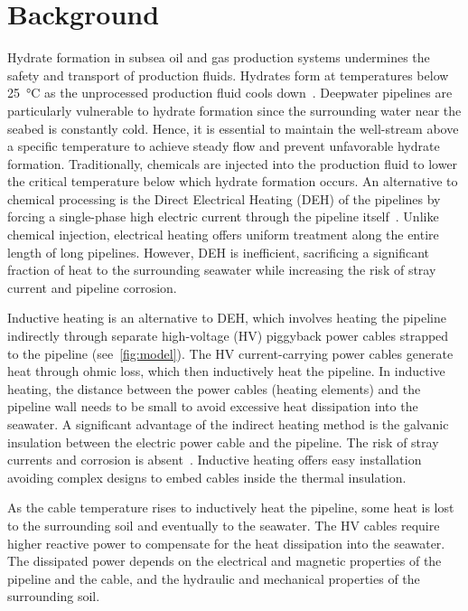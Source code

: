 \documentclass[Journal,letterpaper,InsideFigs]{ascelike-new}
\begin{document}
\section{Background}
Hydrate formation in subsea oil and gas production systems undermines the safety and transport of production fluids. Hydrates form at temperatures below \SI{25}{\celsius} as the unprocessed production fluid cools down~\cite{nazeri2014evaluation,daraboina2015natural}. Deepwater pipelines are particularly vulnerable to hydrate formation since the surrounding water near the seabed is constantly cold. Hence, it is essential to maintain the well-stream above a specific temperature to achieve steady flow and prevent unfavorable hydrate formation. Traditionally, chemicals are injected into the production fluid to lower the critical temperature below which hydrate formation occurs. An alternative to chemical processing is the Direct Electrical Heating (DEH) of the pipelines by forcing a single-phase high electric current through the pipeline itself~\cite{nysveen2005direct}. Unlike chemical injection, electrical heating offers uniform treatment along the entire length of long pipelines. However, DEH is inefficient, sacrificing a  significant fraction of heat to the surrounding seawater while increasing the risk of stray current and pipeline corrosion. 


Inductive heating is an alternative to DEH, which involves heating the pipeline indirectly through separate high-voltage (HV) piggyback power cables strapped to the pipeline (see~\cref{fig:model}). The HV current-carrying power cables generate heat through ohmic loss, which then inductively heat the pipeline. In inductive heating, the distance between the power cables (heating elements) and the pipeline wall needs to be small to avoid excessive heat dissipation into the seawater. A significant advantage of the indirect heating method is the galvanic insulation between the electric power cable and the pipeline. The risk of stray currents and corrosion is absent~\cite{nysveen2005direct}. Inductive heating offers easy installation avoiding complex designs to embed cables inside the thermal insulation. 

As the cable temperature rises to inductively heat the pipeline, some heat is lost to the surrounding soil and eventually to the seawater. The HV cables require higher reactive power to compensate for the heat dissipation into the seawater. The dissipated power depends on the electrical and magnetic properties of the pipeline and the cable, and the hydraulic and mechanical properties of the surrounding soil.
\end{document}
